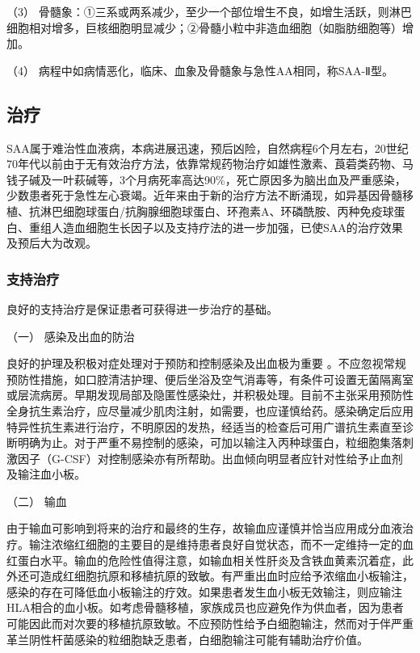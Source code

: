 （3）
骨髓象：①三系或两系减少，至少一个部位增生不良，如增生活跃，则淋巴细胞相对增多，巨核细胞明显减少；②骨髓小粒中非造血细胞（如脂肪细胞等）增加。

（4） 病程中如病情恶化，临床、血象及骨髓象与急性AA相同，称SAA-Ⅱ型。

\subsection{治疗}

SAA属于难治性血液病，本病进展迅速，预后凶险，自然病程6个月左右，20世纪70年代以前由于无有效治疗方法，依靠常规药物治疗如雄性激素、莨菪类药物、马钱子碱及一叶萩碱等，3个月病死率高达90\%，死亡原因多为脑出血及严重感染，少数患者死于急性左心衰竭。近年来由于新的治疗方法不断涌现，如异基因骨髓移植、抗淋巴细胞球蛋白/抗胸腺细胞球蛋白、环孢素A、环磷酰胺、丙种免疫球蛋白、重组人造血细胞生长因子以及支持疗法的进一步加强，已使SAA的治疗效果及预后大为改观。

\subsubsection{支持治疗}

良好的支持治疗是保证患者可获得进一步治疗的基础。

\hypertarget{text00089.htmlux5cux23CHP3-10-1-3-1-1}{}
（一） 感染及出血的防治

良好的护理及积极对症处理对于预防和控制感染及出血极为重要
。不应忽视常规预防性措施，如口腔清洁护理、便后坐浴及空气消毒等，有条件可设置无菌隔离室或层流病房。早期发现局部及隐匿性感染灶，并积极处理。目前不主张采用预防性全身抗生素治疗，应尽量减少肌肉注射，如需要，也应谨慎给药。感染确定后应用特异性抗生素进行治疗，不明原因的发热，经适当的检查后可用广谱抗生素直至诊断明确为止。对于严重不易控制的感染，可加以输注入丙种球蛋白，粒细胞集落刺激因子（G-CSF）对控制感染亦有所帮助。出血倾向明显者应针对性给予止血剂及输注血小板。

\hypertarget{text00089.htmlux5cux23CHP3-10-1-3-1-2}{}
（二） 输血

由于输血可影响到将来的治疗和最终的生存，故输血应谨慎并恰当应用成分血液治疗。输注浓缩红细胞的主要目的是维持患者良好自觉状态，而不一定维持一定的血红蛋白水平。输血的危险性值得注意，如输血相关性肝炎及含铁血黄素沉着症，此外还可造成红细胞抗原和移植抗原的致敏。有严重出血时应给予浓缩血小板输注，感染的存在可降低血小板输注的疗效。如果患者发生血小板无效输注，则应输注HLA相合的血小板。如考虑骨髓移植，家族成员也应避免作为供血者，因为患者可能因此而对次要的移植抗原致敏。不应预防性给予白细胞输注，然而对于伴严重革兰阴性杆菌感染的粒细胞缺乏患者，白细胞输注可能有辅助治疗价值。


